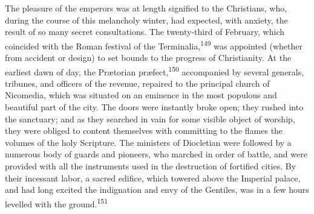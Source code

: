 
The pleasure of the emperors was at length signified to the
Christians, who, during the course of this melancholy winter, had
expected, with anxiety, the result of so many secret
consultations. The twenty-third of February, which coincided with
the Roman festival of the Terminalia,\textsuperscript{149} was appointed (whether
from accident or design) to set bounds to the progress of
Christianity. At the earliest dawn of day, the Prætorian præfect,\textsuperscript{150}
accompanied by several generals, tribunes, and officers of
the revenue, repaired to the principal church of Nicomedia, which
was situated on an eminence in the most populous and beautiful
part of the city. The doors were instantly broke open; they
rushed into the sanctuary; and as they searched in vain for some
visible object of worship, they were obliged to content
themselves with committing to the flames the volumes of the holy
Scripture. The ministers of Diocletian were followed by a
numerous body of guards and pioneers, who marched in order of
battle, and were provided with all the instruments used in the
destruction of fortified cities. By their incessant labor, a
sacred edifice, which towered above the Imperial palace, and had
long excited the indignation and envy of the Gentiles, was in a
few hours levelled with the ground.\textsuperscript{151}




